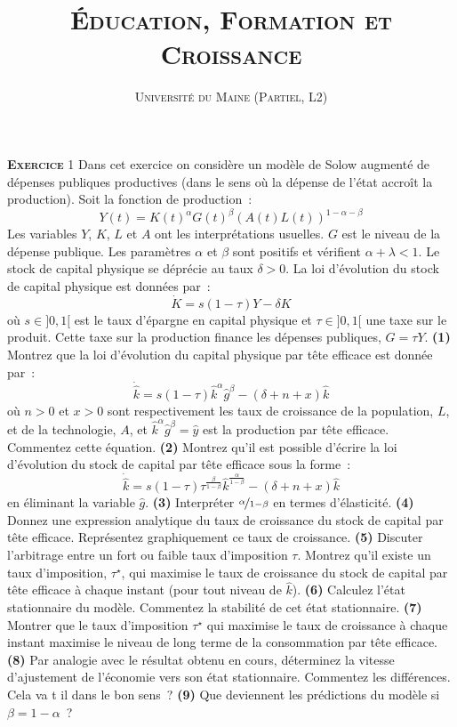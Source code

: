 \documentclass[10pt,a4paper,notitlepage]{article}
\newcommand{\exercice}[1]{\textsc{\textbf{Exercice}} #1}
\newcommand{\question}[1]{\textbf{(#1)}}
\begin{document}
\title{\textsc{Éducation, Formation et Croissance}}
\author{\textsc{Université du Maine (Partiel, L2)}}
\date{}

\maketitle

\exercice{1}  Dans  cet  exercice  on considère  un  modèle  de  Solow
augmenté de dépenses publiques productives (dans le sens où la dépense
de l'état accroît la production).  Soit la fonction de production :
\[
Y(t) = K(t)^{\alpha}G(t)^{\beta}(A(t)L(t))^{1-\alpha-\beta}
\]
Les variables $Y$,  $K$, $L$ et $A$ ont  les interprétations usuelles.
$G$ est le niveau de la  dépense publique.  Les paramètres $\alpha$ et
$\beta$ sont  positifs et  vérifient $\alpha+\lambda<1$.  Le  stock de
capital physique se  déprécie au taux $\delta>0$.   La loi d'évolution
du stock de capital physique est données par :
\[
\dot{K} = s (1-\tau)Y - \delta K
\]
où  $s\in]0,1[$  est   le  taux  d'épargne  en   capital  physique  et
$\tau\in]0,1[$ une taxe sur le  produit.  Cette taxe sur la production
finance les dépenses publiques, $G = \tau Y$. \question{1} Montrez que
la loi  d'évolution du capital  physique par tête efficace  est donnée
par :
\[
\dot{\hat{k}} = s(1-\tau)\hat{k}^{\alpha}\hat{g}^{\beta} - (\delta+n+x)\hat{k}
\]
où $n>0$  et $x>0$ sont  respectivement les  taux de croissance  de la
population,    $L$,     et    de     la    technologie,     $A$,    et
$\hat{k}^{\alpha}\hat{g}^{\beta}=\hat{y}$ est  la production  par tête
efficace.  Commentez cette  équation. \question{2}  Montrez qu'il  est
possible  d'écrire la  loi d'évolution  du stock  de capital  par tête
efficace sous la forme :
\[
\dot{\hat{k}} = s(1-\tau)\tau^{\frac{\beta}{1-\beta}}\hat{k}^{\frac{\alpha}{1-\beta}} - (\delta+n+x)\hat{k}
\]
en éliminant la variable $\hat g$. \question{3} Interpréter
$\nicefrac{\alpha}{1-\beta}$ en termes d'élasticité. \question{4}
Donnez une expression analytique du taux de croissance du stock de
capital par tête efficace.  Représentez graphiquement ce taux de
croissance. \question{5} Discuter l'arbitrage entre un fort ou faible
taux d'imposition $\tau$. Montrez qu'il existe un taux d'imposition,
$\tau^{\star}$, qui maximise le taux de croissance du stock de capital
par tête efficace à chaque instant (pour tout niveau de $\hat k$).
\question{6} Calculez l'état stationnaire du modèle.  Commentez la
stabilité de cet état stationnaire.  \question{7} Montrer que le taux
d'imposition $\tau^{\star}$ qui maximise le taux de croissance à
chaque instant maximise le niveau de long terme de la consommation par
tête efficace. \question{8} Par analogie avec le résultat obtenu en
cours, déterminez la vitesse d'ajustement de l'économie vers son état
stationnaire.  Commentez les différences. Cela va t il dans le bon
sens ? \question{9} Que deviennent les prédictions du modèle si $\beta
= 1-\alpha$ ?
\end{document}
